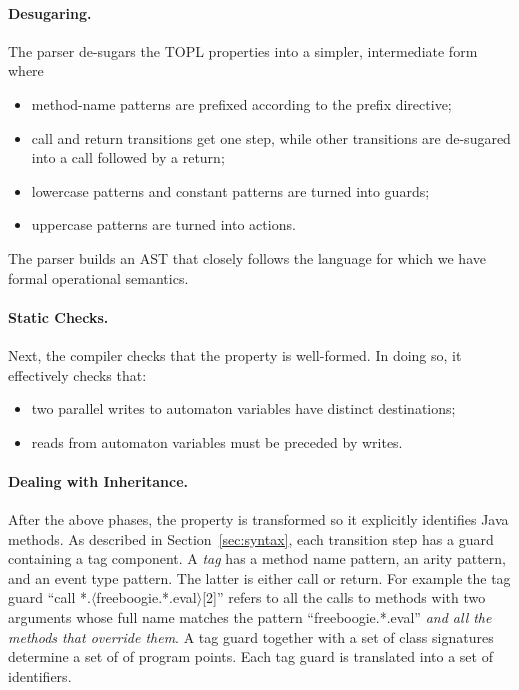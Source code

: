 \documentclass{sigplanconf}[10pt] %
\begin{document}
\paragraph{Desugaring.}
The parser de-sugars the TOPL properties into a simpler, intermediate form where
\begin{itemize}
\item method-name patterns are prefixed according to the \textsf{prefix} directive;
\item \textsf{call} and \textsf{return} transitions get one step, while other transitions are de-sugared into a \textsf{call} followed by a \textsf{return};
\item lowercase patterns and constant patterns are turned into guards;
\item uppercase patterns are turned into actions.
\end{itemize}
The parser builds an AST that closely follows the language for which we have formal operational semantics.

\paragraph{Static Checks.}
Next, the compiler checks that the property is well-formed.
In doing so, it effectively checks that:
\begin{itemize}
\item two parallel writes to automaton variables have distinct destinations;
\item reads from automaton variables must be preceded by writes.
\end{itemize}

\paragraph{Dealing with Inheritance.}
After the above phases, the property is transformed so it explicitly identifies Java methods.
As described in Section~\ref{sec:syntax}, each transition step has a guard containing a tag component.
A \emph{tag} has a method name pattern, an arity pattern, and an event type pattern.
The latter is either \textsf{call} or \textsf{return}.
For example the tag guard ``\textsf{call *.$\langle$freeboogie.*.eval$\rangle$[2]}'' refers to all the calls to methods with two arguments whose full name matches the pattern ``\textsf{freeboogie.*.eval}'' \emph{and all the methods that override them}.
A tag guard together with a set of class signatures determine a set of of program points.
Each tag guard is translated into a set of identifiers.
\end{document}
